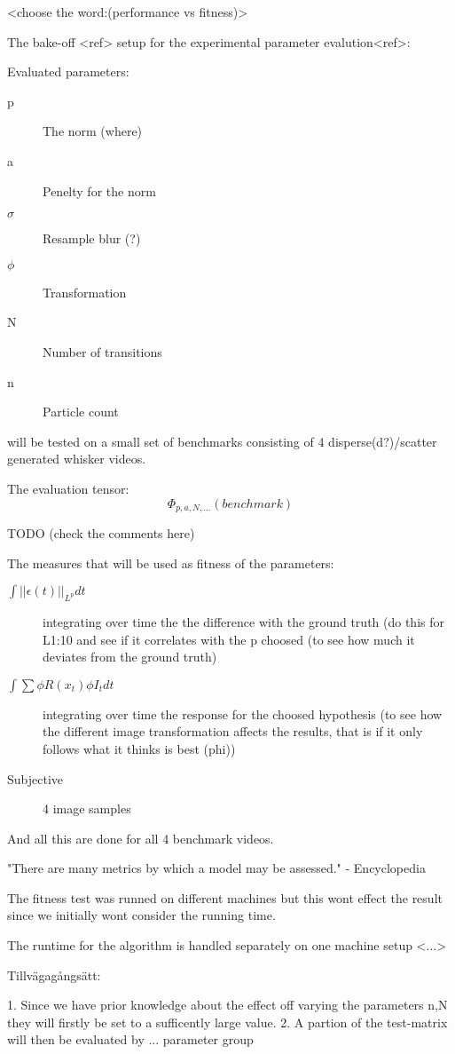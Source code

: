 
<choose the word:(performance vs fitness)>

The bake-off <ref> setup for the experimental parameter evalution<ref>:

Evaluated parameters:
\begin{description}
    \item[p] The norm (where)
    \item[a] Penelty for the norm
    \item[$\sigma$] Resample blur (?)
    \item[$\phi$] Transformation
    \item[N] Number of transitions
    \item[n] Particle count
\end{description}

will be tested on a small set of benchmarks consisting of 4 disperse(d?)/scatter generated whisker videos.

The evaluation tensor:
\begin{equation}
    \Phi_{p,a,N,...}(benchmark)
\end{equation}

TODO (check the comments here)

The measures that will be used as fitness of the parameters:
    \begin{description}
        \item[$\int{||\epsilon(t)||_{L^p}}dt$]
            integrating over time the the difference
            with the ground truth (do this for L{1:10} and see if it correlates with
            the p choosed (to see how much it deviates from the ground truth)
        \item[$\int{\sum{\phi{R(x_t)}\phi{I_t}} }dt$] 
            integrating over time the response
            for the choosed hypothesis (to see how the different image transformation
            affects the results, that is if it only follows what it thinks is best
            (phi))
        \item[Subjective] 4 image samples
    \end{description}
And all this are done for all 4 benchmark videos.


"There are many metrics by which a model may be assessed." - Encyclopedia


The fitness test was runned on different machines but this wont effect the
result since we initially wont consider the running time.

The runtime for the algorithm is handled separately on one machine setup <...>



Tillvägagångsätt:

1. Since we have prior knowledge about the effect off varying the parameters n,N
they will firstly be set to a sufficently large value.
2. A partion of the test-matrix will then be evaluated by ... parameter group 
